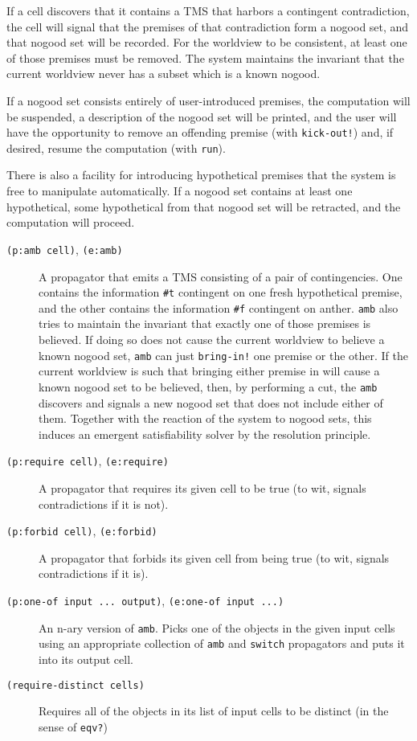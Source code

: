 \documentclass[12pt,letterpaper,english]{article}
\begin{document}
If a cell discovers that it contains a TMS that harbors a contingent
contradiction, the cell will signal that the premises of that
contradiction form a nogood set, and that nogood set will be recorded.
For the worldview to be consistent, at least one of those premises
must be removed.  The system maintains the invariant that the current
worldview never has a subset which is a known nogood.

If a nogood set consists entirely of user-introduced premises, the
computation will be suspended, a description of the nogood set will be
printed, and the user will have the opportunity to remove an offending
premise (with \texttt{kick-out!}) and, if desired, resume the computation
(with \texttt{run}).

There is also a facility for introducing hypothetical premises that
the system is free to manipulate automatically.  If a nogood set
contains at least one hypothetical, some hypothetical from that nogood
set will be retracted, and the computation will proceed.
\begin{description}
\item[{\texttt{(p:amb cell)}, \texttt{(e:amb)}}] \leavevmode 
A propagator that emits a TMS consisting of a pair of contingencies.
One contains the information \texttt{{\#}t} contingent on one fresh
hypothetical premise, and the other contains the information \texttt{{\#}f}
contingent on anther.  \texttt{amb} also tries to maintain the invariant
that exactly one of those premises is believed.  If doing so
does not cause the current worldview to believe a known nogood set,
\texttt{amb} can just \texttt{bring-in!} one premise or the other.  If the current
worldview is such that bringing either premise in will cause a known
nogood set to be believed, then, by performing a cut, the \texttt{amb}
discovers and signals a new nogood set that does not include either
of them.  Together with the reaction of the system to nogood sets,
this induces an emergent satisfiability solver by the resolution
principle.

\item[{\texttt{(p:require cell)}, \texttt{(e:require)}}] \leavevmode 
A propagator that requires its given cell to be true (to wit,
signals contradictions if it is not).

\item[{\texttt{(p:forbid cell)}, \texttt{(e:forbid)}}] \leavevmode 
A propagator that forbids its given cell from being true (to wit,
signals contradictions if it is).

\item[{\texttt{(p:one-of input ... output)}, \texttt{(e:one-of input ...)}}] \leavevmode 
An n-ary version of \texttt{amb}.  Picks one of the objects in the given
input cells using an appropriate collection of \texttt{amb} and
\texttt{switch} propagators and puts it into its output cell.

\item[{\texttt{(require-distinct cells)}}] \leavevmode 
Requires all of the objects in its list of input cells to be
distinct (in the sense of \texttt{eqv?})

\end{description}
\end{document}
